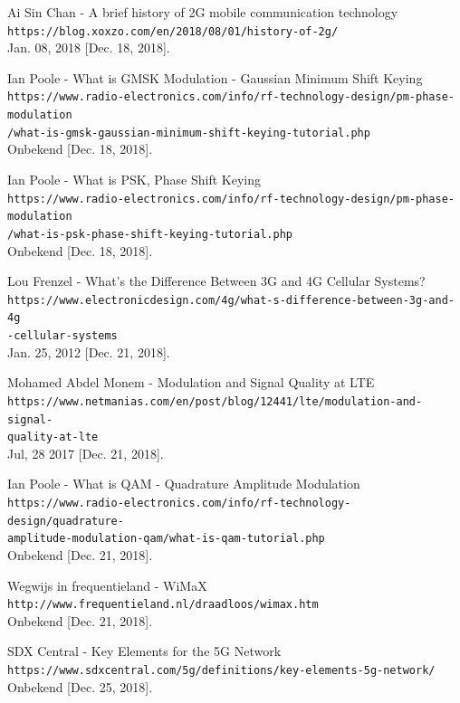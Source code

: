 \documentclass{article}
\begin{document}
\begin{thebibliography}{9}
Ai Sin Chan  - A brief history of 2G mobile communication technology\\
\texttt{https://blog.xoxzo.com/en/2018/08/01/history-of-2g/} \\Jan. 08, 2018 [Dec. 18, 2018]. 

Ian Poole - What is GMSK Modulation - Gaussian Minimum Shift Keying\\
\texttt{https://www.radio-electronics.com/info/rf-technology-design/pm-phase-modulation\\/what-is-gmsk-gaussian-minimum-shift-keying-tutorial.php} \\Onbekend [Dec. 18, 2018].

Ian Poole - What is PSK, Phase Shift Keying\\
\texttt{https://www.radio-electronics.com/info/rf-technology-design/pm-phase-modulation\\/what-is-psk-phase-shift-keying-tutorial.php} \\Onbekend [Dec. 18, 2018].

Lou Frenzel - What’s the Difference Between 3G and 4G Cellular Systems?\\
\texttt{https://www.electronicdesign.com/4g/what-s-difference-between-3g-and-4g\\-cellular-systems}\\ Jan. 25, 2012 [Dec. 21, 2018].

Mohamed Abdel Monem - Modulation and Signal Quality at LTE\\
\texttt{https://www.netmanias.com/en/post/blog/12441/lte/modulation-and-signal-\\quality-at-lte}\\ Jul, 28 2017 [Dec. 21, 2018].

Ian Poole - What is QAM - Quadrature Amplitude Modulation\\
\texttt{https://www.radio-electronics.com/info/rf-technology-design/quadrature-\\amplitude-modulation-qam/what-is-qam-tutorial.php}\\ Onbekend [Dec. 21, 2018].

Wegwijs in frequentieland - WiMaX\\
\texttt{http://www.frequentieland.nl/draadloos/wimax.htm}\\Onbekend [Dec. 21, 2018].

SDX Central - Key Elements for the 5G Network\\
\texttt{https://www.sdxcentral.com/5g/definitions/key-elements-5g-network/} \\Onbekend [Dec. 25, 2018].


\end{thebibliography}
\end{document}
